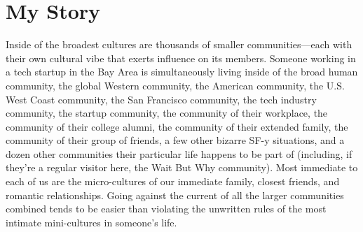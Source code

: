 \documentclass{myresume}
\begin{document}
\section{My Story}

\begin{cvParagraph}
Inside of the broadest cultures are thousands of smaller communities—each with their own cultural vibe that exerts influence on its members. Someone working in a tech startup in the Bay Area is simultaneously living inside of the broad human community, the global Western community, the American community, the U.S. West Coast community, the San Francisco community, the tech industry community, the startup community, the community of their workplace, the community of their college alumni, the community of their extended family, the community of their group of friends, a few other bizarre SF-y situations, and a dozen other communities their particular life happens to be part of (including, if they’re a regular visitor here, the Wait But Why community). Most immediate to each of us are the micro-cultures of our immediate family, closest friends, and romantic relationships. Going against the current of all the larger communities combined tends to be easier than violating the unwritten rules of the most intimate mini-cultures in someone’s life.
\end{cvParagraph}
\end{document}
